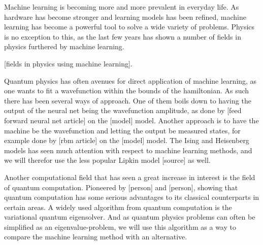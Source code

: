 Machine learning is becoming more and more prevalent in everyday life. As hardware has become stronger and learning models has been refined, machine learning has become a powerful tool to solve a wide variety of problems. Physics is no exception to this, as the last few years has shown a number of fields in physics furthered by machine learning. 

[fields in physics using machine learning].

Quantum physics has often avenues for direct application of machine learning, as one wants to fit a wavefunction within the bounds of the hamiltonian. As such there has been several ways of approach. One of them boils down to having the output of the neural net being the wavefunction amplitude, as done by [feed forward neural net article] on the [model] model. Another approach is to have the machine be the wavefunction and letting the output be measured states, for example done by [rbm article] on the [model] model. The Ising and Heisenberg models has seen much attention with respect to machine learning methods, and we will therefor use the less popular Lipkin model [source] as well.

Another computational field that has seen a great increase in interest is the field of quantum computation. Pioneered by [person] and [person], showing that quantum computation has some serious advantages to its classical counterparts in certain areas. A widely used algorithm from quantum computation is the variational quantum eigensolver. And as quantum physics problems can often be simplified as an eigenvalue-problem, we will use this algorithm as a way to compare the machine learning method with an alternative.
